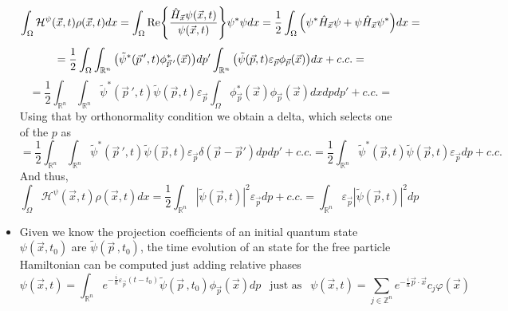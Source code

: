 \documentclass[11pt, a4paper]{article} %
\newcommand{\R}{\mathbb{R}} %
\newcommand{\Z}{\mathbb{Z}} %
\newcommand{\h}{\mathcal{H}}
\begin{document}
\begin{itemize}
{\begin{equation}
\int_\Omega \h^\psi(\vec{x},t)\rho(\vec{x},t) dx =\int_\Omega \Re{\frac{\hat{H}_{\vec{x}}\psi(\vec{x},t)}{\psi(\vec{x},t)}} \psi^*\psi dx =\frac{1}{2}\int_\Omega \qty(\psi^*\hat{H}_{\vec{x}}\psi+\psi\hat{H}_{\vec{x}}\psi^*)dx=
\end{equation}
$$
= \frac{1}{2}\int_\Omega\int_{\R^n}\qty(\tilde{\psi}^*(\vec{p}\,',t)\phi^*_{\vec{p}\,'}(\vec{x}))dp'\int
_{\R^n}\qty(\tilde{\psi}(\vec{p},t)\varepsilon_{\vec{p}} \phi_{\vec{p}}(\vec{x})) dx+c.c.=
$$
$$
=\frac{1}{2}\int_{\R^n}\int_{\R^n}\tilde{\psi}^*(\vec{p}\,',t)\tilde{\psi}(\vec{p},t)\varepsilon_{\vec{p}}\int_{\Omega}\phi^*_{\vec{p}}(\vec{x})\phi_{\vec{p}}(\vec{x})dx dp dp' +c.c.=
$$
Using that by orthonormality condition we obtain a delta, which selects one of the $p$ as
\begin{equation}
=\frac{1}{2}\int_{\R^n}\int_{\R^n}\tilde{\psi}^*(\vec{p}\,',t)\tilde{\psi}(\vec{p},t)\varepsilon_{\vec{p}}\delta(\vec{p}-\vec{p}') dp dp' +c.c.=\frac{1}{2}\int_{\R^n}\tilde{\psi}^*(\vec{p},t)\tilde{\psi}(\vec{p},t)\varepsilon_{\vec{p}}dp  +c.c.
\end{equation}
And thus,
$$
\int_\Omega \h^\psi(\vec{x},t)\rho(\vec{x},t) dx =\frac{1}{2}\int_{\R^n}|\tilde{\psi}(\vec{p},t)|^2\varepsilon_{\vec{p}}dp  +c.c.=\int_{\R^n}\varepsilon_{\vec{p}}|\tilde{\psi}(\vec{p},t)|^2dp
$$
}
\item Given we know the projection coefficients of an initial quantum state $\psi(\vec{x},t_0)$ are $\tilde{\psi}(\vec{p}\,,t_0)$, the time evolution of an state for the free particle Hamiltonian can be computed just adding relative phases 
\begin{equation}
\psi(\vec{x},t)=\int_{\R^n} e^{-\frac{i}{\hbar}\varepsilon_{\vec{p}}(t-t_0)}\tilde{\psi}(\vec{p}\,,t_0)\phi_{\vec{p}}(\vec{x}) dp \ \ \text{ just as }\ \ \psi(\vec{x},t)=\sum_{j\in\Z^n}e^{-\frac{i}{\hbar}\vec{p}\cdot\vec{x}} c_j\varphi(\vec{x})
\end{equation}


\end{itemize}
\end{document}

